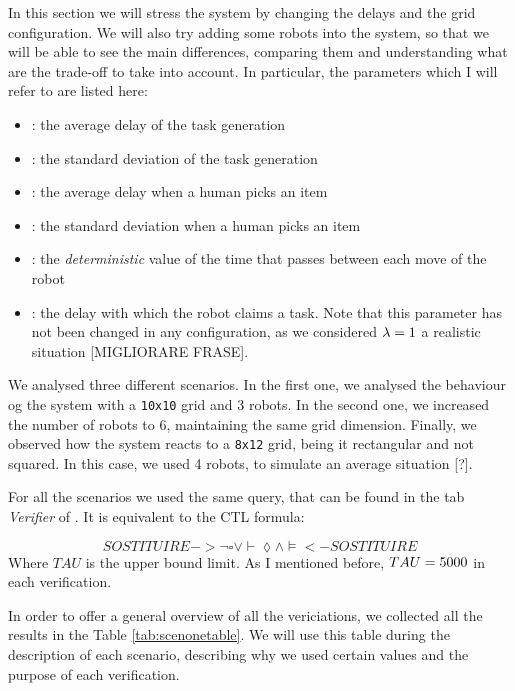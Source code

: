 In this section we will stress the system by changing the delays and the grid configuration. We will also try adding some robots into the system, so that we will be able to see the main differences, comparing them and understanding what are the trade-off to take into account. In particular, the parameters which I will refer to are listed here:
\begin{itemize}
    \item \mT: the average delay of the task generation
    \item \vT: the standard deviation of the task generation
    \item \mH: the average delay when a human picks an item
    \item \vH: the standard deviation when a human picks an item
    \item \K: the \emph{deterministic} value of the time that passes between each move of the robot
    \item \expdel: the delay with which the robot claims a task. Note that this parameter has not been changed in any configuration, as we considered $\lambda= 1$ a realistic situation [MIGLIORARE FRASE].
\end{itemize}

We analysed three different scenarios. In the first one, we analysed the behaviour og the system with a \texttt{10x10} grid and 3 robots. In the second one, we increased the number of robots to 6, maintaining the same grid dimension. Finally, we observed how the system reacts to a \texttt{8x12} grid, being it rectangular and not squared. In this case, we used 4 robots, to simulate an average situation [?].

For all the scenarios we used the same query, that can be found in the tab \emph{Verifier} of \UPPAAL. It is equivalent to the CTL formula:

\begin{equation}
    SOSTITUIRE ->  \lnot \square \vee \vdash \lozenge \wedge \models  <- SOSTITUIRE
\end{equation}
Where $TAU$ is the upper bound limit. As I mentioned before, $TAU = 5000$ in each verification.

In order to offer a general overview of all the vericiations, we collected all the results in the Table \ref{tab:scenonetable}. We will use this table during the description of each scenario, describing why we used certain values and the purpose of each verification.

